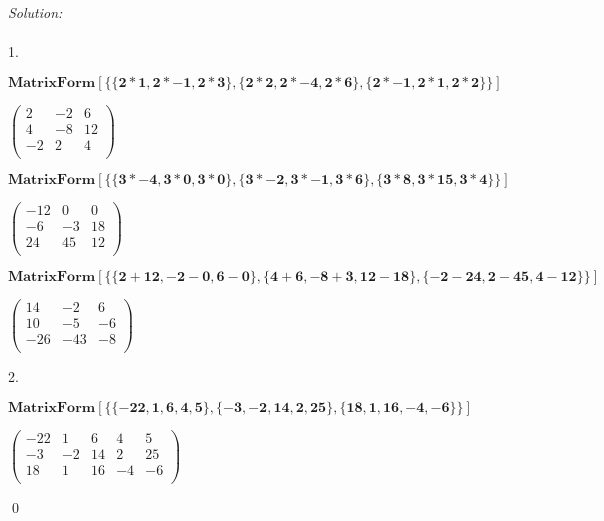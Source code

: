 \documentclass[12pt]{article}
\newenvironment{sol}
    {\emph{Solution:}
    }
    {
    \qed
    }
\begin{document}
\begin{sol} \\ \\
1. 
\begin{doublespace}
\noindent\(\pmb{\text{MatrixForm}[\{\{2*1,2*-1,2*3\},\{2*2,2*-4,2*6\},\{2*-1,2*1,2*2\}\}]}\)
\end{doublespace}

\begin{doublespace}
\noindent\(\left(
\begin{array}{ccc}
 2 & -2 & 6 \\
 4 & -8 & 12 \\
 -2 & 2 & 4 \\
\end{array}
\right)\)
\end{doublespace}

\begin{doublespace}
\noindent\(\pmb{\text{MatrixForm}[\{\{3*-4,3*0,3*0\},\{3*-2,3*-1,3*6\},\{3*8,3*15,3*4\}\}]}\)
\end{doublespace}

\begin{doublespace}
\noindent\(\left(
\begin{array}{ccc}
 -12 & 0 & 0 \\
 -6 & -3 & 18 \\
 24 & 45 & 12 \\
\end{array}
\right)\)
\end{doublespace}

\begin{doublespace}
\noindent\(\pmb{\text{MatrixForm}[\{\{2+12,-2-0,6-0\},\{4+6,-8+3,12-18\},\{-2-24,2-45,4-12\}\}]}\)
\end{doublespace}

\begin{doublespace}
\noindent\(\left(
\begin{array}{ccc}
 14 & -2 & 6 \\
 10 & -5 & -6 \\
 -26 & -43 & -8 \\
\end{array}
\right)\)
\end{doublespace}

2. \begin{doublespace}
\noindent\(\pmb{\text{MatrixForm}[\{\{-22,1,6,4,5\},\{-3,-2,14,2,25\},\{18,1,16,-4,-6\}\}]}\)
\end{doublespace}

\begin{doublespace}
\noindent\(\left(
\begin{array}{ccccc}
 -22 & 1 & 6 & 4 & 5 \\
 -3 & -2 & 14 & 2 & 25 \\
 18 & 1 & 16 & -4 & -6 \\
\end{array}
\right)\)
\end{doublespace}


\end{sol}
\end{document}
